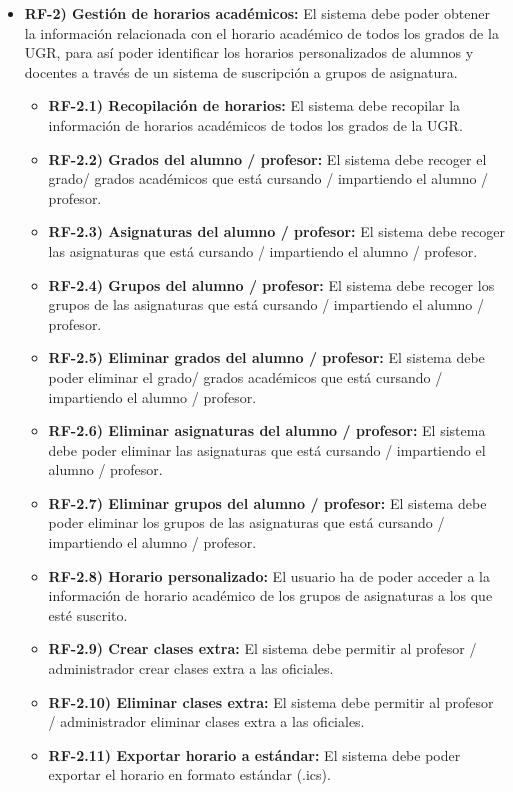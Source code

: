 \begin{itemize}
    \item \textbf{RF-2) Gestión de horarios académicos:} El sistema debe poder obtener la información relacionada con el horario académico de todos los grados de la UGR, para así poder identificar los horarios personalizados de alumnos y docentes a través de un sistema de suscripción a grupos de asignatura.
    \begin{itemize}
        \item \textbf{RF-2.1) Recopilación de horarios:} El sistema debe recopilar la información de horarios académicos de todos los grados de la UGR.
        \item \textbf{RF-2.2) Grados del alumno / profesor:} El sistema debe recoger el grado/ grados académicos que está cursando / impartiendo el alumno / profesor.
        \item \textbf{RF-2.3) Asignaturas del alumno / profesor:} El sistema debe recoger las asignaturas que está cursando / impartiendo el alumno / profesor.
        \item \textbf{RF-2.4) Grupos del alumno / profesor:} El sistema debe recoger los grupos de las asignaturas que está cursando / impartiendo el alumno / profesor.
        \item \textbf{RF-2.5) Eliminar grados del alumno / profesor:} El sistema debe poder eliminar el grado/ grados académicos que está cursando / impartiendo el alumno / profesor.
        \item \textbf{RF-2.6) Eliminar asignaturas del alumno / profesor:} El sistema debe poder eliminar las asignaturas que está cursando / impartiendo el alumno / profesor.
        \item \textbf{RF-2.7) Eliminar grupos del alumno / profesor:} El sistema debe poder eliminar los grupos de las asignaturas que está cursando / impartiendo el alumno / profesor.
        \item \textbf{RF-2.8) Horario personalizado:} El usuario ha de poder acceder a la información de horario académico de los grupos de asignaturas a los que esté suscrito.
        \item \textbf{RF-2.9) Crear clases extra:} El sistema debe permitir al profesor / administrador crear clases extra a las oficiales.
        \item \textbf{RF-2.10) Eliminar clases extra:} El sistema debe permitir al profesor / administrador eliminar clases extra a las oficiales.
        \item \textbf{RF-2.11) Exportar horario a estándar:} El sistema debe poder exportar el horario en formato estándar (.ics).

\end{itemize}
\end{itemize}
